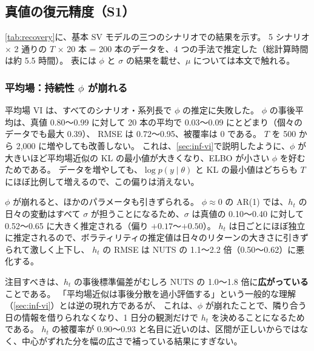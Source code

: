 \subsection{真値の復元精度（S1）}\label{sec:syn-recovery}

\cref{tab:recovery}に、基本 SV モデルの三つのシナリオでの結果を示す。
5 シナリオ × 2 通りの $T$ × 20 本 = 200 本のデータを、4 つの手法で推定した（総計算時間は約 5.5 時間）。
表には $\phi$ と $\sigma$ の結果を載せ、$\mu$ については本文で触れる。

\begin{table}[tbp]
  \centering
  \caption{真値の復元精度（S1、基本 SV モデル、各条件 20 本の複製）。
    RMSE と被覆率（95\% 信用区間が真値を含む割合）は\cref{eq:syn-metrics}。
    $h_t$ の RMSE と被覆率は時点について平均したもので、複製で平均している。
    sd 比は、$h_t$ の事後標準偏差の NUTS に対する比（時点についての中央値）の、複製についての中央値。
    時間は JIT コンパイルを含む総時間の中央値（VI は 10,000 ステップ、NUTS は 4 連鎖でウォームアップ・サンプリング各 2,000 回）。}
  \label{tab:recovery}
  \small
  \setlength{\tabcolsep}{4pt}
  
\end{table}

\subsubsection{平均場：持続性 $\phi$ が崩れる}

平均場 VI は、すべてのシナリオ・系列長で $\phi$ の推定に失敗した。
$\phi$ の事後平均は、真値 0.80〜0.99 に対して 20 本の平均で 0.03〜0.09 にとどまり（個々のデータでも最大 0.39）、
RMSE は 0.72〜0.95、被覆率は 0 である。
$T$ を 500 から 2,000 に増やしても改善しない。
これは、\cref{sec:inf-vi}で説明したように、$\phi$ が大きいほど平均場近似の KL の最小値が大きくなり、ELBO が小さい $\phi$ を好むためである。
データを増やしても、$\log p(y \mid \theta)$ と KL の最小値はどちらも $T$ にほぼ比例して増えるので、この偏りは消えない。

$\phi$ が崩れると、ほかのパラメータも引きずられる。
$\phi \approx 0$ の AR(1) では、$h_t$ の日々の変動はすべて $\sigma$ が担うことになるため、$\sigma$ は真値の 0.10〜0.40 に対して 0.52〜0.65 に大きく推定される（偏り $+0.17$〜$+0.50$）。
$h_t$ は日ごとにほぼ独立に推定されるので、ボラティリティの推定値は日々のリターンの大きさに引きずられて激しく上下し、
$h_t$ の RMSE は NUTS の 1.1〜2.2 倍（0.50〜0.62）に悪化する。

注目すべきは、$h_t$ の事後標準偏差がむしろ NUTS の 1.0〜1.8 倍に\textbf{広がっている}ことである。
「平均場近似は事後分散を過小評価する」という一般的な理解（\cref{sec:inf-vi}）とは逆の現れ方であるが、
これは、$\phi$ が崩れたことで、隣り合う日の情報を借りられなくなり、1 日分の観測だけで $h_t$ を決めることになるためである。
$h_t$ の被覆率が 0.90〜0.93 と名目に近いのは、区間が正しいからではなく、中心がずれた分を幅の広さで補っている結果にすぎない。

